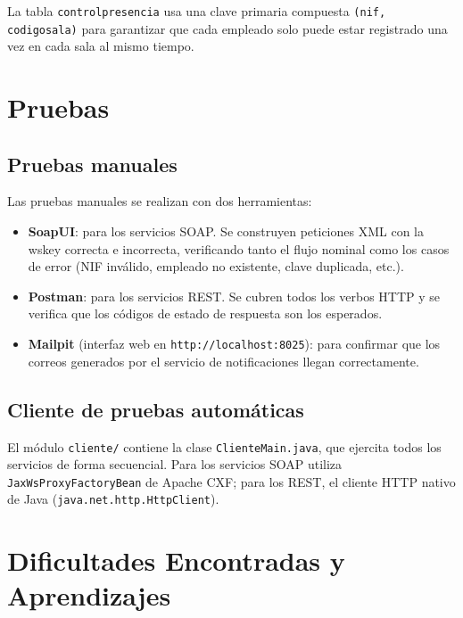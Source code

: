 \documentclass[12pt, a4paper]{article}
\begin{document}
La tabla \texttt{controlpresencia} usa una clave primaria compuesta \texttt{(nif, codigosala)} para garantizar que cada empleado solo puede estar registrado una vez en cada sala al mismo tiempo.

\section{Pruebas}

\subsection{Pruebas manuales}

Las pruebas manuales se realizan con dos herramientas:

\begin{itemize}
  \item \textbf{SoapUI}: para los servicios SOAP. Se construyen peticiones XML con la wskey correcta e incorrecta, verificando tanto el flujo nominal como los casos de error (NIF inválido, empleado no existente, clave duplicada, etc.).
  \item \textbf{Postman}: para los servicios REST. Se cubren todos los verbos HTTP y se verifica que los códigos de estado de respuesta son los esperados.
  \item \textbf{Mailpit} (interfaz web en \texttt{http://localhost:8025}): para confirmar que los correos generados por el servicio de notificaciones llegan correctamente.
\end{itemize}

\subsection{Cliente de pruebas automáticas}

El módulo \texttt{cliente/} contiene la clase \texttt{ClienteMain.java}, que ejercita todos los servicios de forma secuencial. Para los servicios SOAP utiliza \texttt{JaxWsProxyFactoryBean} de Apache CXF; para los REST, el cliente HTTP nativo de Java (\texttt{java.net.http.HttpClient}).

\section{Dificultades Encontradas y Aprendizajes}
\end{document}
